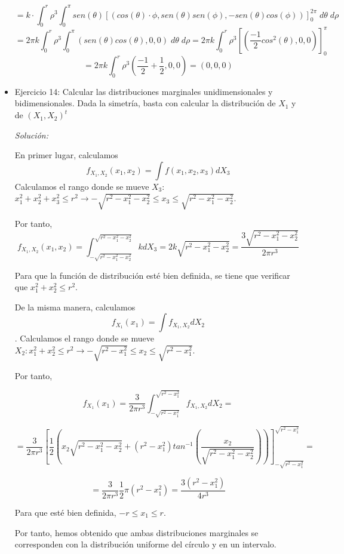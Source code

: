 \documentclass{article}
\theoremstyle{theorem-style}  %
\theoremstyle{definition}
\theoremstyle{example-style}
\begin{document}
\begin{itemize}
		$$= k \cdot \int_{0}^{r} \rho^3 \int_{0}^{\pi} sen(\theta) \left[(cos(\theta)\cdot \phi, sen(\theta)sen(\phi),-sen(\theta)cos(\phi))\right]^{2\pi}_0\;d\theta\;d\rho$$
		$$= 2\pi k \int_{0}^{r} \rho^3 \int_{0}^{\pi} (sen(\theta)cos(\theta),0,0)\;d\theta\;d\rho = 2\pi k \int_{0}^{r} \rho^3 \left[\left(\frac{-1}{2}cos^2(\theta),0,0\right)\right]_0^\pi$$
		$$= 2\pi k \int_{0}^{r} \rho^3 \left(\frac{-1}{2}+\frac{1}{2},0,0\right) = (0,0,0)$$
		
		
		\item Ejercicio 14: Calcular las distribuciones marginales unidimensionales y bidimensionales. Dada la simetría, basta con calcular la distribución de $X_1$ y de $(X_1, X_2)^t$
		
		\textit{Solución:}
	
		
		En primer lugar, calculamos \[f_{X_1, X_2}(x_1, x_2) = \int f(x_1, x_2, x_3) dX_3\] Calculamos el rango donde se mueve $X_3$: $x_1^2 + x_2 ^2 + x_3 ^2 \leq r^2 \rightarrow - \sqrt{r^2 - x_1^2 - x_2^2} \leq x_3 \leq \sqrt{r^2 - x_1^2 - x_2^2}$.
		
		Por tanto, \[f_{X_1, X_2}(x_1, x_2) = \int_{-\sqrt{r^2-x_1^2-x_2^2}}^{\sqrt{r^2 - x_1^2 - x_2^2}} k dX_3 = 2 k \sqrt{r^2 - x_1^2 - x_2^2} = \frac{3 \sqrt{r^2 - x_1^2 - x_2^2}}{2 \pi r^3}\]
		
		Para que la función de distribución esté bien definida, se tiene que verificar que $x_1 ^2 + x_2^2 \leq r^2$. 
		

		De la misma manera, calculamos \[f_{X_1}(x_1) = \int f_{X_1, X_2} dX_2\]. Calculamos el rango donde se mueve $X_2: x_1^2 + x_2^2 \leq r^2 \rightarrow - \sqrt{r^2 - x_1^2} \leq x_2 \leq  \sqrt{r^2 - x_1^2}$.
		
		Por tanto,
		
		\[
		f_{X_1}(x_1) = \frac{3}{2 \pi r^3} \int_{- \sqrt{r^2 - x_1^2} }^{\sqrt{r^2 - x_1^2}} f_{X_1, X_2} dX_2 =
		\]
		
		\[  = \frac{3}{2 \pi r^3} \left[\frac{1}{2} \left( x_2 \sqrt{ r^2 - x_1^2 - x_2 ^2 } + (r^2 - x_1 ^2) tan ^{-1} \left( \frac{x_2}{\sqrt{r^2 - x_1 ^2 - x_2^2}}\right)   \right) \right]_{- \sqrt{r^2 - x_1^2} } ^{\sqrt{r^2 - x_1^2}} =
		\]
		
		\[
		=\frac{3}{2 \pi r^3} \frac{1}{2} \pi (r^2 - x_1^2) =  \frac{3 (r^2 - x_1^2)}{4 r^3}
		\] 
		
		Para que esté bien definida, $-r \leq x_1 \leq r$.
		
		Por tanto, hemos obtenido que ambas distribuciones marginales se corresponden con la distribución uniforme del círculo y en un intervalo. 
		

\end{itemize}
\end{document}
